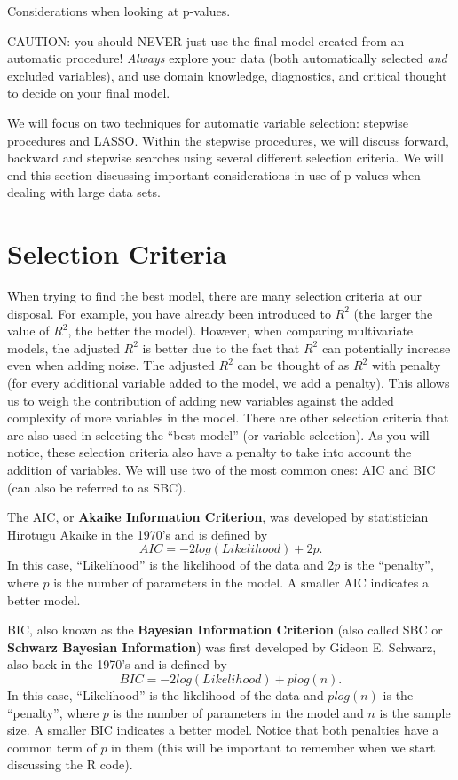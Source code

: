 \documentclass[
  letterpaper,
  DIV=11,
  numbers=noendperiod]{scrreprt}
\begin{document}
Considerations when looking at p-values.

CAUTION: you should NEVER just use the final model created from an
automatic procedure! \emph{Always} explore your data (both automatically
selected \emph{and} excluded variables), and use domain knowledge,
diagnostics, and critical thought to decide on your final model.

We will focus on two techniques for automatic variable selection:
stepwise procedures and LASSO. Within the stepwise procedures, we will
discuss forward, backward and stepwise searches using several different
selection criteria. We will end this section discussing important
considerations in use of p-values when dealing with large data sets.

\hypertarget{selection-criteria}{%
\section{Selection Criteria}\label{selection-criteria}}

When trying to find the best model, there are many selection criteria at
our disposal. For example, you have already been introduced to \(R^{2}\)
(the larger the value of \(R^{2}\), the better the model). However, when
comparing multivariate models, the adjusted \(R^{2}\) is better due to
the fact that \(R^{2}\) can potentially increase even when adding noise.
The adjusted \(R^{2}\) can be thought of as \(R^{2}\) with penalty (for
every additional variable added to the model, we add a penalty). This
allows us to weigh the contribution of adding new variables against the
added complexity of more variables in the model. There are other
selection criteria that are also used in selecting the ``best model''
(or variable selection). As you will notice, these selection criteria
also have a penalty to take into account the addition of variables. We
will use two of the most common ones: AIC and BIC (can also be referred
to as SBC).

The AIC, or \textbf{Akaike Information Criterion}, was developed by
statistician Hirotugu Akaike in the 1970's and is defined by
\[ AIC = -2log(Likelihood) + 2p.  \] In this case, ``Likelihood'' is the
likelihood of the data and \(2p\) is the ``penalty'', where \(p\) is the
number of parameters in the model. A smaller AIC indicates a better
model.

BIC, also known as the \textbf{Bayesian Information Criterion} (also
called SBC or \textbf{Schwarz Bayesian Information}) was first developed
by Gideon E. Schwarz, also back in the 1970's and is defined by
\[BIC = -2log(Likelihood) + plog(n). \] In this case, ``Likelihood'' is
the likelihood of the data and \(plog(n)\) is the ``penalty'', where
\(p\) is the number of parameters in the model and \(n\) is the sample
size. A smaller BIC indicates a better model. Notice that both penalties
have a common term of \(p\) in them (this will be important to remember
when we start discussing the R code).
\end{document}
